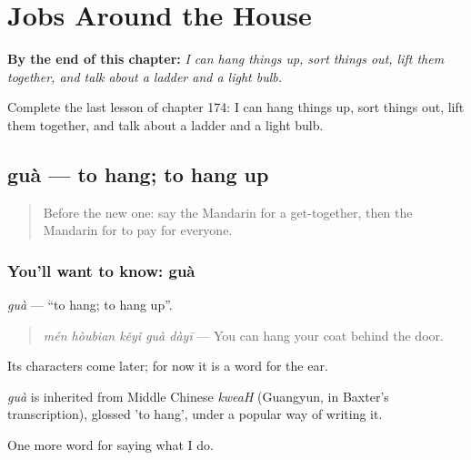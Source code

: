 
\chapter{Jobs Around the House}
\label{ch:zh-jobs-around-the-house}

\begin{chapteropening}
\textbf{By the end of this chapter:} \emph{I can hang things up, sort things out, lift them together, and talk about a ladder and a light bulb.}

Complete the last lesson of chapter 174: I can hang things up, sort things out, lift them together, and talk about a ladder and a light bulb.
\end{chapteropening}

\section[guà]{guà — to hang; to hang up}

\label{lesson:ZH-C174-gua}



\begin{quote}
Before the new one: say the Mandarin for a get-together, then the Mandarin for to pay for everyone.
\end{quote}

\subsection*{You'll want to know: guà}
\emph{guà} — \textquotedblleft{}to hang; to hang up\textquotedblright{}.

\begin{quote}
\emph{mén hòubian kěyǐ guà dàyī} — You can hang your coat behind the door.
\end{quote}

Its characters come later; for now it is a word for the ear.

\begin{cousinweb}
\emph{guà} is inherited from Middle Chinese \emph{kweaH} (Guangyun, in Baxter's transcription), glossed 'to hang', under a popular way of writing it.
\end{cousinweb}

\begin{grammarlens}[title={What you've built}]
One more word for saying what I do.
\end{grammarlens}

